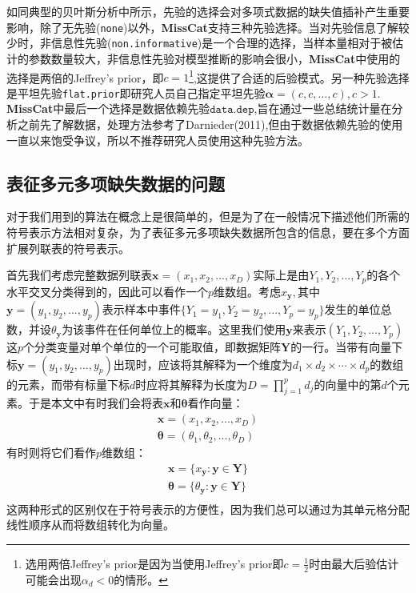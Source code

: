 \documentclass[12pt,hyperref,a4paper,UTF8]{ctexart}
\begin{document}
如同典型的贝叶斯分析中所示，先验的选择会对多项式数据的缺失值插补产生重要影响，除了无先验(\texttt{none})以外，\textbf{MissCat}支持三种先验选择。当对先验信息了解较少时，非信息性先验(\texttt{non.informative})是一个合理的选择，当样本量相对于被估计的参数数量较大，非信息性先验对模型推断的影响会很小，\textbf{MissCat}中使用的选择是两倍的Jeffrey's prior，即$c=1$\footnote{选用两倍Jeffrey's prior是因为当使用Jeffrey's prior即$c=\frac{1}{2}$时由最大后验估计可能会出现$\alpha_d<0$的情形。},这提供了合适的后验模式。另一种先验选择是平坦先验\texttt{flat.prior}即研究人员自己指定平坦先验$\boldsymbol{\alpha}=(c,c,...,c),c>1.$\textbf{MissCat}中最后一个选择是数据依赖先验$\texttt{data.dep}$,旨在通过一些总结统计量在分析之前先了解数据，处理方法参考了Darnieder(2011),但由于数据依赖先验的使用一直以来饱受争议，所以不推荐研究人员使用这种先验方法。

\subsection{表征多元多项缺失数据的问题}
对于我们用到的算法在概念上是很简单的，但是为了在一般情况下描述他们所需的符号表示方法相对复杂，为了表征多元多项缺失数据所包含的信息，要在多个方面扩展列联表的符号表示。

首先我们考虑完整数据列联表$\boldsymbol{x}=(x_1,x_2,...,x_D)$实际上是由$Y_1,Y_2,...,Y_p$的各个水平交叉分类得到的，因此可以看作一个$p$维数组。考虑$x_{\boldsymbol{y}},$其中$\boldsymbol{y}=(y_1,y_2,...,y_p)$表示样本中事件$\{Y_1=y_1,Y_2=y_2,...,Y_p=y_p\}$发生的单位总数，并设$\theta_{\boldsymbol{y}}$为该事件在任何单位上的概率。这里我们使用$\boldsymbol{y}$来表示$(Y_1,Y_2,...,Y_p)$这$p$个分类变量对单个单位的一个可能取值，即数据矩阵$\boldsymbol{Y}$的一行。当带有向量下标$\boldsymbol{y}=(y_1,y_2,...,y_p)$出现时，应该将其解释为一个维度为$d_1\times d_2\times \cdots\times d_p$的数组的元素，而带有标量下标$d$时应将其解释为长度为$D=\prod_{j=1}^p d_j$的向量中的第$d$个元素。于是本文中有时我们会将表$\boldsymbol{x}$和$\boldsymbol{\theta}$看作向量：
\begin{align*}
    \boldsymbol{x}=(x_1,x_2,...,x_D)\\
    \boldsymbol{\theta}=(\theta_1,\theta_2,...,\theta_D)
\end{align*}
有时则将它们看作$p$维数组：
\begin{align*}
    \boldsymbol{x}=\{x_{\boldsymbol{y}}:\boldsymbol{y}\in\boldsymbol{Y}\}\\
    \boldsymbol{\theta}=\{\theta_{\boldsymbol{y}}:\boldsymbol{y}\in\boldsymbol{Y}\}\\
\end{align*}
这两种形式的区别仅在于符号表示的方便性，因为我们总可以通过为其单元格分配线性顺序从而将数组转化为向量。
\end{document}
